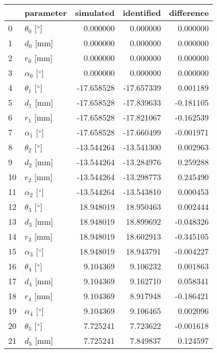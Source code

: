 \documentclass{standalone}%
\begin{document}
%
\normalsize%
\begin{tabular}{llrrr}
\toprule
{} &                 parameter &  simulated & identified & difference \\
\midrule
0  &  $\theta_{0}$ [$\degree$] &   0.000000 &   0.000000 &   0.000000 \\
1  &              $d_{0}$ [mm] &   0.000000 &   0.000000 &   0.000000 \\
2  &              $r_{0}$ [mm] &   0.000000 &   0.000000 &   0.000000 \\
3  &  $\alpha_{0}$ [$\degree$] &   0.000000 &   0.000000 &   0.000000 \\
4  &  $\theta_{1}$ [$\degree$] & -17.658528 & -17.657339 &   0.001189 \\
5  &              $d_{1}$ [mm] & -17.658528 & -17.839633 &  -0.181105 \\
6  &              $r_{1}$ [mm] & -17.658528 & -17.821067 &  -0.162539 \\
7  &  $\alpha_{1}$ [$\degree$] & -17.658528 & -17.660499 &  -0.001971 \\
8  &  $\theta_{2}$ [$\degree$] & -13.544264 & -13.541300 &   0.002963 \\
9  &              $d_{2}$ [mm] & -13.544264 & -13.284976 &   0.259288 \\
10 &              $r_{2}$ [mm] & -13.544264 & -13.298773 &   0.245490 \\
11 &  $\alpha_{2}$ [$\degree$] & -13.544264 & -13.543810 &   0.000453 \\
12 &  $\theta_{3}$ [$\degree$] &  18.948019 &  18.950463 &   0.002444 \\
13 &              $d_{3}$ [mm] &  18.948019 &  18.899692 &  -0.048326 \\
14 &              $r_{3}$ [mm] &  18.948019 &  18.602913 &  -0.345105 \\
15 &  $\alpha_{3}$ [$\degree$] &  18.948019 &  18.943791 &  -0.004227 \\
16 &  $\theta_{4}$ [$\degree$] &   9.104369 &   9.106232 &   0.001863 \\
17 &              $d_{4}$ [mm] &   9.104369 &   9.162710 &   0.058341 \\
18 &              $r_{4}$ [mm] &   9.104369 &   8.917948 &  -0.186421 \\
19 &  $\alpha_{4}$ [$\degree$] &   9.104369 &   9.106465 &   0.002096 \\
20 &  $\theta_{5}$ [$\degree$] &   7.725241 &   7.723622 &  -0.001618 \\
21 &              $d_{5}$ [mm] &   7.725241 &   7.849837 &   0.124597 \\

\end{tabular}
\end{document}
